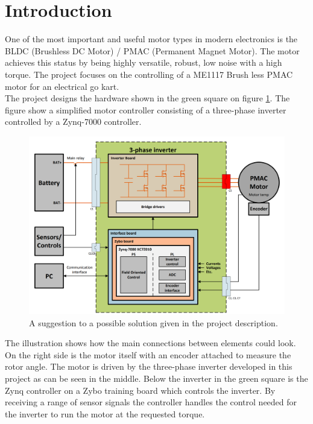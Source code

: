 \section{Introduction}
\label{sec:introduction}
One of the most important and useful motor types in modern electronics is the BLDC (Brushless DC Motor) / PMAC (Permanent Magnet Motor). The motor achieves this status by being highly versatile, robust, low noise with a high torque. The project focuses on the controlling of a ME1117 Brush less PMAC motor for an electrical go kart. \\

The project designs the hardware shown in the green square on figure \ref{fig:Possiblesolution}. The figure show a simplified motor controller consisting of a three-phase inverter controlled by a Zynq-7000 controller.



\begin{figure} [H]
  \centering
  \includegraphics[width=\linewidth]{pictures/general/Project1.PNG}
  \caption{A suggestion to a possible solution given in the project description. \cite{Project 1. semester - S19}}
  \label{fig:Possiblesolution}
\end{figure}

The illustration shows how the main connections between elements could look. On the right side is the motor itself with an encoder attached to measure the rotor angle. The motor is driven by the three-phase inverter developed in this project as can be seen in the middle. Below the inverter in the green square is the Zynq controller on a Zybo training board which controls the inverter. By receiving a range of sensor signals the controller handles the control needed for the inverter to run the motor at the requested torque.

